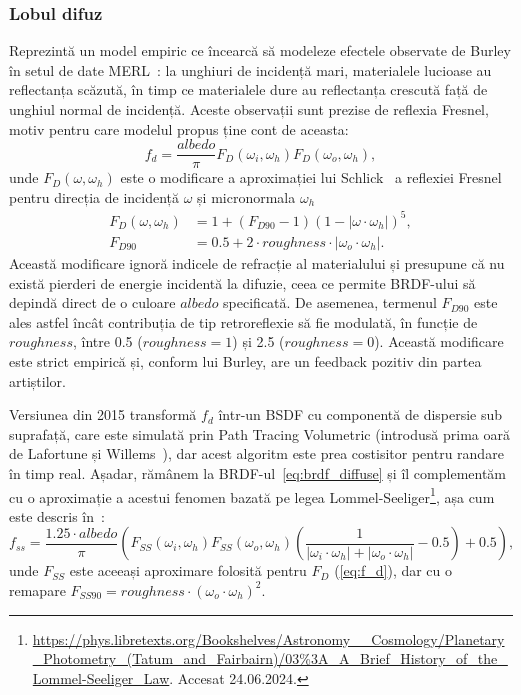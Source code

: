 \documentclass[12pt,a4paper]{report}
\numberwithin{equation}{section} %
\begin{document}
\subsubsection*{Lobul difuz}
Reprezintă un model empiric ce încearcă să modeleze efectele
observate de Burley în setul de date MERL~\cite{MERL}: la unghiuri de incidență
mari, materialele lucioase au reflectanța scăzută, în timp ce materialele
dure au reflectanța crescută față de unghiul normal de incidență. Aceste
observații sunt prezise de reflexia Fresnel, motiv pentru care modelul propus
ține cont de aceasta:
\begin{equation}\label{eq:brdf_diffuse}
	f_d = \dfrac{albedo}{\pi}F_D(\omega_i, \omega_h)F_D(\omega_o, \omega_h),
\end{equation}
unde $F_D(\omega, \omega_h)$ este o modificare a aproximației lui Schlick~\cite{Schlick} a
reflexiei Fresnel pentru direcția de incidență $\omega$ și micronormala $\omega_h$
\begin{equation}
	\begin{aligned}\label{eq:f_d}
		F_D(\omega, \omega_h) & = 1 + (F_{D90} - 1)(1 - |\omega \cdot \omega_h|)^5,      \\
		F_{D90}               & = 0.5 + 2\cdot roughness\cdot |\omega_o \cdot \omega_h|.
	\end{aligned}
\end{equation}
Această modificare ignoră indicele de refracție al materialului și presupune
că nu există pierderi de energie incidentă la difuzie, ceea ce permite
BRDF-ului să depindă direct de o culoare $albedo$ specificată. De asemenea, termenul $F_{D90}$ este
ales astfel încât contribuția de tip retroreflexie să fie modulată, în funcție
de $roughness$, între 0.5 ($roughness = 1$) și 2.5 ($roughness = 0$). Această
modificare este strict empirică și, conform lui Burley, are un feedback pozitiv
din partea artiștilor.

Versiunea din 2015 transformă $f_d$ într-un BSDF cu componentă de dispersie
sub suprafață, care este simulată prin Path Tracing Volumetric (introdusă prima oară de Lafortune și Willems~\cite{Volumetric}),
dar acest algoritm este prea costisitor pentru randare în timp real.
Așadar, rămânem la BRDF-ul~\ref{eq:brdf_diffuse} și îl complementăm cu o aproximație
a acestui fenomen bazată pe legea Lommel-Seeliger\footnote{\url{https://phys.libretexts.org/Bookshelves/Astronomy__Cosmology/Planetary_Photometry_(Tatum_and_Fairbairn)/03\%3A_A_Brief_History_of_the_Lommel-Seeliger_Law}. Accesat 24.06.2024.}, așa cum este descris în~\cite{DisneyHomework}:
\begin{equation}
	f_{ss} = \dfrac{1.25\cdot albedo}{\pi} \left(F_{SS}(\omega_i, \omega_h)F_{SS}(\omega_o, \omega_h) \left(\dfrac{1}{|\omega_i \cdot \omega_h| + |\omega_o \cdot \omega_h|} - 0.5\right) + 0.5 \right),
\end{equation}
unde $F_{SS}$ este aceeași aproximare folosită pentru $F_D$ (\ref{eq:f_d}), dar cu o remapare $F_{SS90} = roughness\cdot (\omega_o\cdot \omega_h)^2$.
\end{document}
